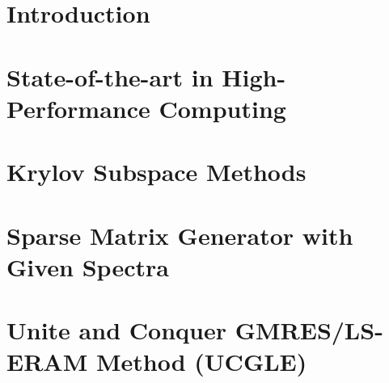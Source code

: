 \documentclass{xinzhewu}
\begin{document}
\clearemptydoublepage


\clearemptydoublepage

\frontmatter

{\tableofcontents}

{
\listoffigures
{}
}

{
\listoftables
{}
}

{
\listofalgorithms
{}
}

\printnomenclature



\mainmatter %

\chapter{Introduction}



\chapter{State-of-the-art in High-Performance Computing} \label{State-of-the-art in High-Performance Computing}



\chapter{Krylov Subspace Methods}\label{Krylov Subspace Methods}



\chapter{Sparse Matrix Generator with Given Spectra}\label{Sparse Matrix Generator with Given Spectra}



\chapter[Unite and Conquer GMRES/LS-ERAM Method (UCGLE)]{Unite and Conquer GMRES/LS-ERAM Method (UCGLE)}\label{Unite and Conquer GMRES/LS-ERAM Method}


\end{document}
